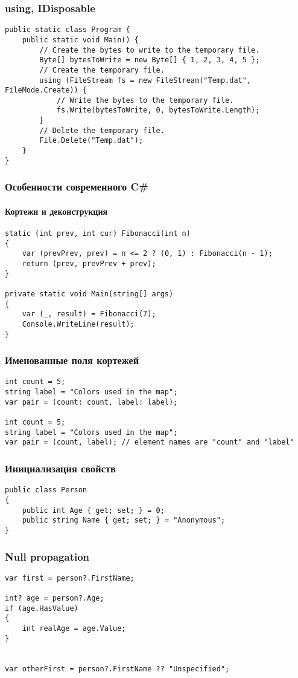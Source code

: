 \documentclass[xetex,mathserif,serif]{beamer}
\begin{document}
	\begin{frame}[fragile]
		\frametitle{using, IDisposable}
		\begin{small}
			\begin{verbatim}
public static class Program {
    public static void Main() {
        // Create the bytes to write to the temporary file.
        Byte[] bytesToWrite = new Byte[] { 1, 2, 3, 4, 5 };
        // Create the temporary file.
        using (FileStream fs = new FileStream("Temp.dat", FileMode.Create)) {
            // Write the bytes to the temporary file.
            fs.Write(bytesToWrite, 0, bytesToWrite.Length);
        }
        // Delete the temporary file.
        File.Delete("Temp.dat");
    }
}
			\end{verbatim}
		\end{small}
	\end{frame}

	\begin{frame}[fragile]
		\frametitle{Особенности современного C\#}
		\framesubtitle{Кортежи и деконструкция}
		\begin{verbatim}
static (int prev, int cur) Fibonacci(int n)
{
    var (prevPrev, prev) = n <= 2 ? (0, 1) : Fibonacci(n - 1);
    return (prev, prevPrev + prev);
}

private static void Main(string[] args)
{
    var (_, result) = Fibonacci(7);
    Console.WriteLine(result);
}
		\end{verbatim}
	\end{frame}

	\begin{frame}[fragile]
		\frametitle{Именованные поля кортежей}
		\begin{verbatim}
int count = 5;
string label = "Colors used in the map";
var pair = (count: count, label: label);

int count = 5;
string label = "Colors used in the map";
var pair = (count, label); // element names are "count" and "label"
		\end{verbatim}
	\end{frame}

	\begin{frame}[fragile]
		\frametitle{Инициализация свойств}
		\begin{verbatim}
public class Person
{
    public int Age { get; set; } = 0;
    public string Name { get; set; } = "Anonymous";
}
		\end{verbatim}
	\end{frame}

	\begin{frame}[fragile]
		\frametitle{Null propagation}
		\begin{verbatim}
var first = person?.FirstName;

int? age = person?.Age;
if (age.HasValue)
{
    int realAge = age.Value;
}


var otherFirst = person?.FirstName ?? "Unspecified";
		\end{verbatim}
	\end{frame}
\end{document}

